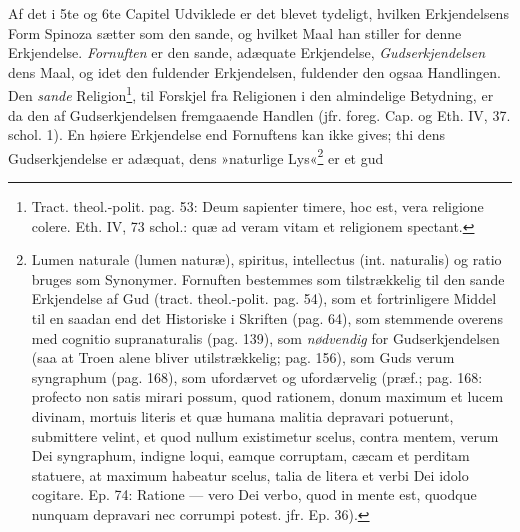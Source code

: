 \documentclass[12pt,a4paper]{book}
\newcommand{\opage}[1]{\marginnote{\footnotesize\textit{[#1]}}}
\begin{document}
Af det i 5te og 6te Capitel Udviklede er det blevet tydeligt, hvilken Erkjendelsens Form Spinoza sætter som den sande, og hvilket Maal han stiller for denne Erkjendelse. \emph{Fornuften} er den sande, adæquate Erkjendelse, \emph{Gudserkjendelsen} dens Maal, og idet den fuldender Erkjendelsen, fuldender den ogsaa Handlingen. Den \emph{sande} Religion\footnote{Tract. theol.-polit. pag. 53: Deum sapienter timere, hoc est, vera religione colere. Eth. IV, 73 schol.: quæ ad veram vitam et religionem spectant.}, til Forskjel fra Religionen i den almindelige Betydning, er da den af Gudserkjendelsen fremgaaende Handlen (jfr. foreg. Cap. og Eth. IV, 37. schol. 1). En høiere Erkjendelse end Fornuftens kan ikke gives; thi dens Gudserkjendelse er adæquat, dens »naturlige Lys«\footnote{Lumen naturale (lumen naturæ), spiritus, intellectus (int. naturalis) og ratio bruges som Synonymer. Fornuften bestemmes som tilstrækkelig til den sande Erkjendelse af Gud (tract. theol.-polit. pag. 54), som et fortrinligere Middel til en saadan end det Historiske i Skriften (pag. 64), som stemmende overens med cognitio supranaturalis (pag. 139), som \emph{nødvendig} for Gudserkjendelsen (saa at Troen alene bliver utilstrækkelig; pag. 156), som Guds verum syngraphum (pag. 168), som ufordærvet og ufordærvelig (præf.; pag. 168: profecto non satis mirari possum, quod rationem, donum maximum et lucem divinam, mortuis literis et quæ humana malitia depravari potuerunt, submittere velint, et quod nullum existimetur scelus, contra mentem, verum Dei syngraphum, indigne loqui, eamque corruptam, cæcam et perditam statuere, at maximum habeatur scelus, talia de litera et verbi Dei idolo cogitare. Ep. 74: Ratione --- vero Dei verbo, quod in mente est, quodque nunquam depravari nec corrumpi potest. jfr. Ep. 36).} er et gud\-%
\opage{148}\setcounter{footnote}{0}%
\end{document}
